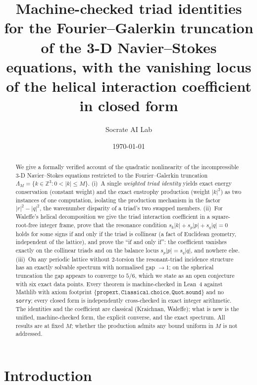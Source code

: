\documentclass[11pt]{amsart}
\title[Exact triad structure of truncated 3-D Navier--Stokes]
{Machine-checked triad identities for the Fourier--Galerkin truncation\\
of the 3-D Navier--Stokes equations, with the vanishing locus\\
of the helical interaction coefficient in closed form}
\author{Socrate AI Lab}
\date{\today}
\newcommand{\Z}{\mathbb{Z}}
\newcommand{\Lam}{\Lambda_M}
\theoremstyle{plain}
\theoremstyle{definition}
\theoremstyle{remark}
\begin{document}
\maketitle

\begin{abstract}
We give a formally verified account of the quadratic nonlinearity of the incompressible 3-D
Navier--Stokes equations restricted to the Fourier--Galerkin truncation
$\Lam = \{k \in \Z^3 : 0 < |k| \le M\}$. (i)~A single \emph{weighted triad identity} yields
exact energy conservation (constant weight) and the exact enstrophy production
(weight $|k|^2$) as two instances of one computation, isolating the production mechanism in the
factor $|r|^2 - |q|^2$, the wavenumber disparity of a triad's two swapped members. (ii)~For
Waleffe's helical decomposition we give the triad interaction coefficient in a square-root-free
integer frame, prove that the resonance condition $s_k|k| + s_p|p| + s_q|q| = 0$ holds for some
signs if and only if the triad is collinear (a fact of Euclidean geometry, independent of the
lattice), and prove the ``if and only if'': the coefficient vanishes exactly on the collinear
triads and on the balance locus $s_p|p| = s_q|q|$, and nowhere else. (iii)~On any periodic lattice
without $2$-torsion the resonant-triad incidence structure has an exactly solvable spectrum with
normalised gap $\to 1$; on the spherical truncation the gap appears to converge to $5/6$, which we
state as an open conjecture with six exact data points. Every theorem is machine-checked in Lean~4
against Mathlib with axiom footprint $\{\mathtt{propext}, \mathtt{Classical.choice},
\mathtt{Quot.sound}\}$ and no \texttt{sorry}; every closed form is independently cross-checked in
exact integer arithmetic. The identities and the coefficient are classical (Kraichnan, Waleffe);
what is new is the unified, machine-checked form, the explicit converse, and the exact spectrum.
All results are at fixed $M$; whether the production admits any bound uniform in $M$ is not
addressed.
\end{abstract}

\section{Introduction}
\end{document}
